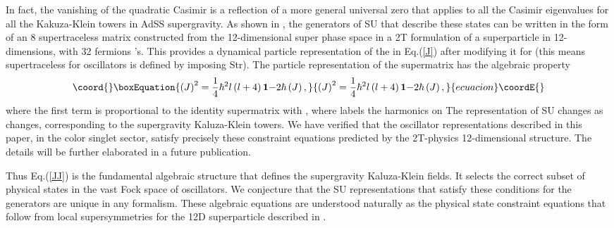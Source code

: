 \documentclass[a4paper,aps,preprint,nofootinbib]{revtex4}
\begin{document}
In fact, the vanishing of the quadratic Casimir is a reflection of
a more general universal zero that applies to all the Casimir
eigenvalues for all the Kakuza-Klein towers in AdS\coordHE{}S\coordHE{} supergravity. As shown in \cite{AdS5S5}, the generators
of SU\coordHE{} that describe these states can be
written in the form of an 8\coordHE{} supertraceless matrix \coordHE{}
constructed from the 12-dimensional super phase space \coordHE{} in a 2T formulation of a
superparticle in 12-dimensions, with 32 fermions \myHighlight{$\Theta $}\coordHE{}'s. This
provides a dynamical particle representation of the \coordHE{} in
Eq.(\ref{J}) after modifying it for \coordHE{} (this means
supertraceless \coordHE{} for oscillators is defined by imposing
Str\coordHE{}). The particle representation of the
supermatrix has the algebraic property \cite{AdS5S5}
\begin{equation}\coord{}\boxEquation{
\left( J\right) ^{2}=\frac{1}{4}\hbar ^{2}l\left( l+4\right)
\mathbf{1-} 2\hbar \left( J\right) ,  \label{JJ}
}{
\left( J\right) ^{2}=\frac{1}{4}\hbar ^{2}l\left( l+4\right)
\mathbf{1-} 2\hbar \left( J\right) ,  }{ecuacion}\coordE{}\end{equation}%
where the first term is proportional to the identity supermatrix
\coordHE{} with \coordHE{} , where \coordHE{} labels the
harmonics on \coordHE{} The representation of SU\coordHE{} changes as \coordHE{} changes, corresponding to the
supergravity Kaluza-Klein towers. We have verified that the
oscillator representations described in this paper, in the color
singlet sector, satisfy precisely these constraint equations
predicted by the 2T-physics 12-dimensional structure. The details
will be further elaborated in a future publication.

Thus Eq.(\ref{JJ}) is the fundamental algebraic structure that
defines the supergravity Kaluza-Klein fields. It selects the
correct subset of physical states in the vast Fock space of
oscillators. We conjecture that the SU\coordHE{}
representations that satisfy these conditions for the generators
\coordHE{} are unique in any formalism. These algebraic equations are
understood naturally as the physical state constraint equations
that follow from local supersymmetries for the 12D superparticle
described in \cite{AdS5S5}.
\end{document}

